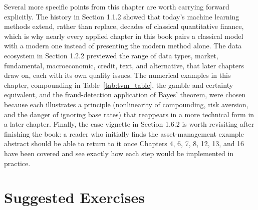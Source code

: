 \documentclass[../ai_in_finance]{subfiles}
\begin{document}
Several more specific points from this chapter are worth carrying forward explicitly. The history in Section 1.1.2 showed that today's machine learning methods extend, rather than replace, decades of classical quantitative finance, which is why nearly every applied chapter in this book pairs a classical model with a modern one instead of presenting the modern method alone.
The data ecosystem in Section 1.2.2 previewed the range of data types, market, fundamental, macroeconomic, credit, text, and alternative, that later chapters draw on, each with its own quality issues.
The numerical examples in this chapter, compounding in Table~\ref{tab:tvm_table}, the gamble and certainty equivalent, and the fraud-detection application of Bayes' theorem, were chosen because each illustrates a principle (nonlinearity of compounding, risk aversion, and the danger of ignoring base rates) that reappears in a more technical form in a later chapter.
Finally, the case vignette in Section 1.6.2 is worth revisiting after finishing the book: a reader who initially finds the asset-management example abstract should be able to return to it once Chapters 4, 6, 7, 8, 12, 13, and 16 have been covered and see exactly how each step would be implemented in practice.

\section{Suggested Exercises}
\end{document}
